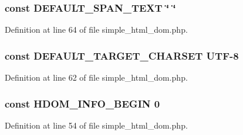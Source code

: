 \subsubsection[{D\+E\+F\+A\+U\+L\+T\+\_\+\+S\+P\+A\+N\+\_\+\+T\+E\+X\+T}]{\setlength{\rightskip}{0pt plus 5cm}const D\+E\+F\+A\+U\+L\+T\+\_\+\+S\+P\+A\+N\+\_\+\+T\+E\+X\+T \char`\"{} \char`\"{}}\label{simple__html__dom_8php_a30d58d7d3a53efc61f064b53a434bafe}


Definition at line 64 of file simple\+\_\+html\+\_\+dom.\+php.

\hypertarget{simple__html__dom_8php_aeb01f6d83a65d695ad327473f838319a}{}
\subsubsection[{D\+E\+F\+A\+U\+L\+T\+\_\+\+T\+A\+R\+G\+E\+T\+\_\+\+C\+H\+A\+R\+S\+E\+T}]{\setlength{\rightskip}{0pt plus 5cm}const D\+E\+F\+A\+U\+L\+T\+\_\+\+T\+A\+R\+G\+E\+T\+\_\+\+C\+H\+A\+R\+S\+E\+T \textquotesingle{}U\+T\+F-\/8\textquotesingle{}}\label{simple__html__dom_8php_aeb01f6d83a65d695ad327473f838319a}


Definition at line 62 of file simple\+\_\+html\+\_\+dom.\+php.

\hypertarget{simple__html__dom_8php_a05decffbdf780e841c1198d24aa889a1}{}
\subsubsection[{H\+D\+O\+M\+\_\+\+I\+N\+F\+O\+\_\+\+B\+E\+G\+I\+N}]{\setlength{\rightskip}{0pt plus 5cm}const H\+D\+O\+M\+\_\+\+I\+N\+F\+O\+\_\+\+B\+E\+G\+I\+N 0}\label{simple__html__dom_8php_a05decffbdf780e841c1198d24aa889a1}


Definition at line 54 of file simple\+\_\+html\+\_\+dom.\+php.



